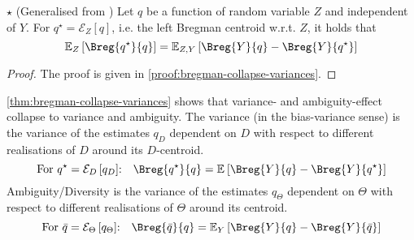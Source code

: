 \documentclass[../main.tex]{subfiles}
\begin{document}
\begin{lemma} \label{thm:bregman-collapse-variances}$\star$ (Generalised from \cite{wood_UnifiedTheoryDiversity_2023})
Let $q$ be a function of random variable $Z$ and independent of $Y$. For $q^\star = \mathcal{E}_{Z}\left[ q \right]$, i.e. the left Bregman centroid w.r.t. $Z$, it holds that
$$
\mathbb{E}_{Z}\left[ \Breg{q^\star}{q} \right] 
 = \mathbb{E}_{Z,Y}\left[ \Breg{Y}{q} - \Breg{Y}{q^\star} \right] 
$$
\end{lemma}
\begin{proof}
The proof is given in \cref{proof:bregman-collapse-variances}.
\end{proof}


\cref{thm:bregman-collapse-variances} shows that variance- and ambiguity-effect collapse to variance and ambiguity. The variance (in the bias-variance sense) is the variance of the estimates $q_D$ dependent on $D$ with respect to different realisations of $D$ around its $D$-centroid. 
$$
\text{For $q^\star = \mathcal{E}_D\left[q_D\right]$:}\hspace{1em}
\Breg{q^\star}{q} = \mathbb{E}_{}\left[ \Breg{Y}{q} - \Breg{Y}{q^\star} \right]
$$
Ambiguity/Diversity is the variance of the estimates $q_\Theta$ dependent on $\Theta$ with respect to different realisations of $\Theta$ around its centroid.
$$
\text{For $\bar{q} = \mathcal{E}_\Theta\left[q_\Theta\right]$:}\hspace{1em}
\Breg{\bar{q}}{q} = \mathbb{E}_{Y}\left[ \Breg{Y}{q} - \Breg{Y}{\bar{q}} \right]
$$
\end{document}
